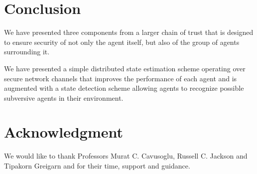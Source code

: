 \documentclass[conference]{IEEEtran}
\begin{document}
\section{Conclusion} \label{Conclusion}
We have presented three components from a larger chain of trust that is designed to ensure security of not only the agent itself, but also of the group of agents surrounding it.

We have presented a simple distributed state estimation scheme operating over secure network channels that improves the performance of each agent and is augmented with a state detection scheme allowing agents to recognize possible subversive agents in their environment.

\section*{Acknowledgment}
We would like to thank Professors Murat C. Cavusoglu, Russell C. Jackson and Tipakorn Greigarn and for their time, support and guidance.

\printbibliography
\end{document}
